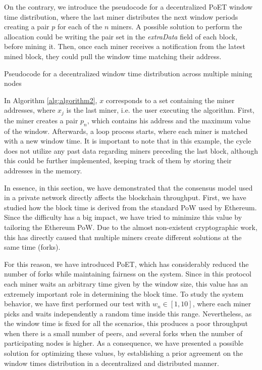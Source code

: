 On the contrary, we introduce the pseudocode for a decentralized PoET window time distribution, where the last miner distributes the next window periods creating a pair $p$ for each of the $n$ miners. A possible solution to perform the allocation could be writing the pair set in the \textit{extraData} field of each block, before mining it. Then, once each miner receives a notification from the latest mined block, they could pull the window time matching their address.

 \begin{algorithm}
  \caption{Pseudocode for a decentralized window time distribution across multiple mining nodes}
 \label{alg:algorithm2}
  \begin{algorithmic}[1]
  \ENDFOR
 \end{algorithmic}
\end{algorithm}

In Algorithm \ref{alg:algorithm2}, $x$ corresponds to a set containing the miner addresses, where $x_j$ is the last miner, i.e. the user executing the algorithm. First, the miner creates a pair $p_n$, which contains his address and the maximum value of the window. Afterwards, a loop process starts, where each miner is matched with a new window time. It is important to note that in this example, the cycle does not utilize any past data regarding miners preceding the last block, although this could be further implemented, keeping track of them by storing their addresses in the memory.

In essence, in this section, we have demonstrated that the consensus model used in a private network directly affects the blockchain throughput. First, we have studied how the block time is derived from the standard PoW used by Ethereum. Since the difficulty has a big impact, we have tried to minimize this value by tailoring the Ethereum PoW. Due to the almost non-existent cryptographic work, this has directly caused that multiple miners create different solutions at the same time (forks). 

For this reason, we have introduced PoET, which has considerably reduced the number of forks while maintaining fairness on the system. Since in this protocol each miner waits an arbitrary time given by the window size, this value has an extremely important role in determining the block time. To study the system behavior, we have first performed our test with $w_n \in [1,10]$, where each miner picks and waits independently a random time inside this range. Nevertheless, as the window time is fixed for all the scenarios, this produces a poor throughput when there is a small number of peers, and several forks when the number of participating nodes is higher. As a consequence, we have presented a possible solution for optimizing these values, by establishing a prior agreement on the window times distribution in a decentralized and distributed manner.

